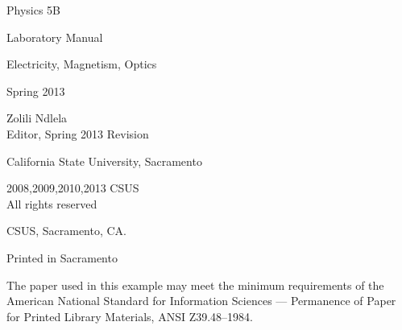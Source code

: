 
\newpage
\vspace*	{2in}
\begin{center}
	\HUGE\textsf{Physics 5B}\par
\end{center}
\begin{center}
	\LARGE\textsf{Laboratory Manual}\par
\end{center}
\begin{center}
	\HUGE\textsf{Electricity, Magnetism, Optics}\par
\end{center}
\begin{center}
	\Huge\textsf{Spring 2013}\par
\end{center}
\vfill
\begin{center}
	\LARGE\textsf{Zolili Ndlela\\Editor, Spring 2013 Revision}\par
\LARGE\textsf{California State University, Sacramento}\par
\end{center}
 
\vspace*{\fill}
\def\ZUN{Z\kern-0.2em U\kern-0.4em N}%
\def\ZUN{Z\kern-0.15em U\kern-0.3em N}%
\clearpage

\begingroup
\footnotesize
\setlength{\parindent}{0pt}
\setlength{\parskip}{\baselineskip}
\textcopyright{} 2008,2009,2010,2013 CSUS \\
All rights reserved

CSUS, Sacramento, CA.

Printed in Sacramento 

The paper used in this example may meet the minimum requirements
of the American National Standard for Information 
Sciences --- Permanence of Paper for Printed Library Materials, 
ANSI Z39.48--1984.

